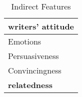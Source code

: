 \begin{table}[ht]
\centering
\footnotesize 
\begin{tabular}{@{}l@{}}

\toprule
\textbf{writers' attitude} \\ \midrule
Emotions \\
Persuasiveness \\
Convincingness\\


\toprule
\textbf{relatedness} \\ \midrule



\bottomrule
\end{tabular}
\caption{Indirect Features}
\label{tab:Indirect_Features}
\end{table}
